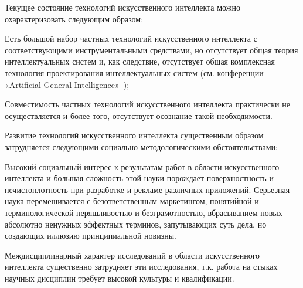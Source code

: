 \begin{SCn}
{Текущее состояние технологий искусственного интеллекта можно охарактеризовать следующим образом:
\begin{scnitemize}
    \item Есть большой набор частных технологий искусственного интеллекта с соответствующими инструментальными средствами, но отсутствует общая теория интеллектуальных систем и, как следствие, отсутствует общая комплексная технология проектирования интеллектуальных систем  (см. конференции «Artificial General Intelligence»~\cite{AGI2018});
    \item Совместимость частных технологий искусственного интеллекта практически не осуществляется и более того, отсутствует осознание такой необходимости.
\end{scnitemize}


Развитие технологий искусственного интеллекта существенным образом затрудняется следующими социально-методологическими обстоятельствами:
\begin{scnitemize}
    \item Высокий социальный интерес к результатам работ в области искусственного интеллекта и большая сложность этой науки порождает поверхностность и нечистоплотность при разработке и рекламе различных приложений. Серьезная наука перемешивается с безответственным маркетингом, понятийной и терминологической неряшливостью и безграмотностью, вбрасыванием новых абсолютно ненужных эффектных терминов, запутывающих суть дела, но создающих иллюзию принципиальной новизны.
    \item Междисциплинарный характер исследований в области искусственного интеллекта существенно затрудняет эти исследования, т.к. работа на стыках научных дисциплин требует высокой культуры и квалификации.
\end{scnitemize}}


\end{SCn}
